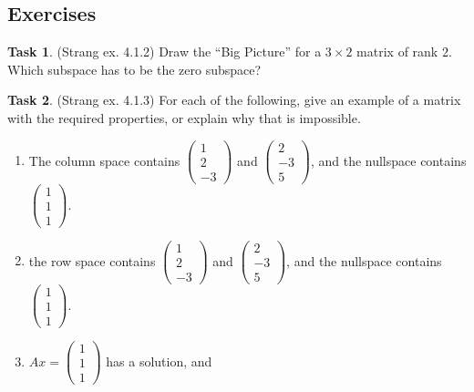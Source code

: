 \documentclass[10pt,]{book}
\theoremstyle{plain}
\theoremstyle{definition}
\numberwithin{equation}{section}
\newtheorem{task}{Task}[chapter]
\begin{document}
\subsection[Exercises]{Exercises}\label{subsection-96}
\begin{task}
\label{task-121}
(Strang ex. 4.1.2)
        Draw the ``Big Picture'' for a \(3\times 2\) matrix of rank \(2\).
        Which subspace has to be the zero subspace?
      \end{task}
\begin{task}
\label{task-122}
(Strang ex. 4.1.3)
        For each of the following, give an example of a matrix with the required
        properties, or explain why that is impossible.
        \begin{enumerate}
\item{}
            The column space contains \(\begin{pmatrix} 1 \\ 2 \\ -3\end{pmatrix}\)
            and \(\begin{pmatrix} 2 \\ -3 \\ 5 \end{pmatrix}\), and the nullspace
            contains \(\begin{pmatrix} 1\\1\\1 \end{pmatrix}\).
          \item{}
            the row space contains \(\begin{pmatrix} 1 \\ 2 \\ -3\end{pmatrix}\)
            and \(\begin{pmatrix} 2 \\ -3 \\ 5 \end{pmatrix}\), and the nullspace
            contains \(\begin{pmatrix} 1\\1\\1 \end{pmatrix}\).
          \item{}
            \(Ax = \begin{pmatrix}1 \\ 1\\ 1\end{pmatrix}\) has a solution, and

\end{enumerate}
\end{task}
\end{document}
